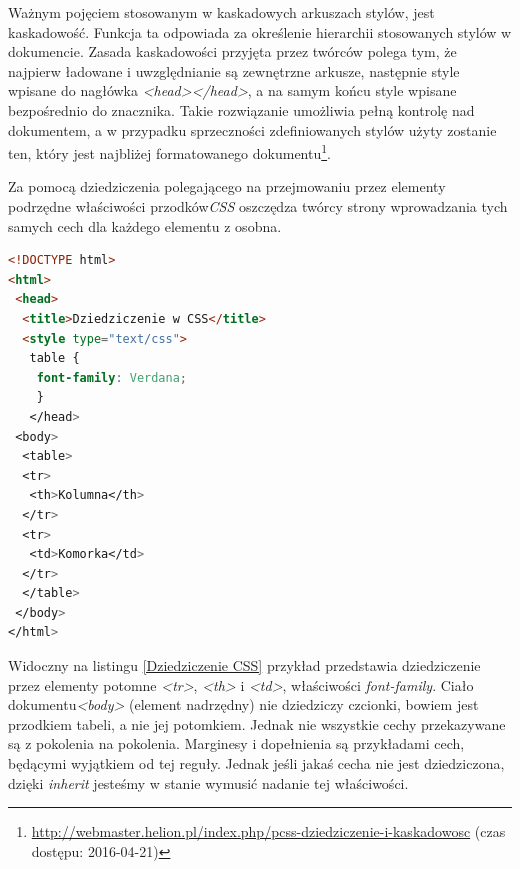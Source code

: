 \documentclass{iiuwb}
\begin{document}
Ważnym pojęciem stosowanym w kaskadowych arkuszach stylów, jest kaskadowość. Funkcja ta odpowiada za określenie hierarchii stosowanych stylów w dokumencie. Zasada kaskadowości przyjęta przez twórców polega tym, że najpierw ładowane i uwzględnianie są zewnętrzne arkusze, następnie style wpisane do nagłówka \textit{<head></head>}, a na samym końcu style wpisane bezpośrednio do znacznika. Takie rozwiązanie umożliwia pełną kontrolę nad dokumentem, a w przypadku sprzeczności zdefiniowanych stylów użyty zostanie ten, który jest najbliżej formatowanego dokumentu\footnote{\url{http://webmaster.helion.pl/index.php/pcss-dziedziczenie-i-kaskadowosc} (czas dostępu: 2016-04-21)}.

Za pomocą dziedziczenia polegającego na przejmowaniu przez elementy podrzędne właściwości przodków\textit{CSS} oszczędza twórcy strony wprowadzania tych samych cech dla każdego elementu z osobna. 
\begin{lstlisting}[language=HTML, label=Dziedziczenie CSS, caption=Dziedziczenie w CSS]
<!DOCTYPE html>
<html>
 <head>
  <title>Dziedziczenie w CSS</title>
  <style type="text/css">
   table {
    font-family: Verdana;
    }
   </head>
 <body>
  <table>
  <tr>
   <th>Kolumna</th>  
  </tr>
  <tr>
   <td>Komorka</td>
  </tr>  
  </table> 
 </body>
</html>
\end{lstlisting} 
Widoczny na listingu \ref{Dziedziczenie CSS} przykład przedstawia dziedziczenie przez elementy potomne \textit{<tr>}, \textit{<th>} i \textit{<td>}, właściwości \textit{font-family}. Ciało dokumentu\textit{<body>} (element nadrzędny) nie dziedziczy czcionki, bowiem jest przodkiem tabeli, a nie jej potomkiem. Jednak nie wszystkie cechy przekazywane są z pokolenia na pokolenia. Marginesy i dopełnienia są przykładami cech, będącymi wyjątkiem od tej reguły. Jednak jeśli jakaś cecha nie jest dziedziczona, dzięki \textit{inherit} jesteśmy w stanie wymusić nadanie tej właściwości. 
\end{document}

